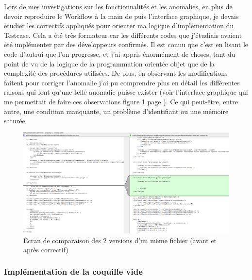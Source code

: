 Lors de mes investigations sur les fonctionnalit\'{e}s et les anomalies, en plus de devoir reproduire le \gls{Workflow} \`{a} la main de puis l'interface graphique, je devais \'{e}tudier les correctifs appliqu\'{e}s pour orienter ma logique d'impl\'{e}mentation du \gls{Testcase}. Cela a \'{e}t\'{e} tr\`{e}s formateur car les diff\'{e}rents codes que j'\'{e}tudiais avaient \'{e}t\'{e} impl\'{e}menter par des d\'{e}veloppeurs confirm\'{e}s. Il est connu que c'est en lisant le code d'autrui que l'on progresse, et j'ai appris \'{e}norm\'{e}ment de choses, tant du point de vu de la logique de la programmation orient\'{e}e objet que de la complexit\'{e} des proc\'{e}dures utilis\'{e}es. De plus, en observant les modifications faitent pour corriger l'anomalie j'ai pu comprendre plus en d\'{e}tail les diff\'{e}rentes raisons qui font qu'une telle anomalie puisse exister (voir l'interface graphique qui me permettait de faire ces observations figure \ref{figure:diffAgainst} page \pageref{figure:diffAgainst}). Ce qui peut-\^{e}tre, entre autre, une condition manquante, un probl\`{e}me d'identifiant ou une m\'{e}moire satur\'{e}e.\\


\begin{figure}[!ht]
  \centering
      \includegraphics[width=\textwidth]{images/diffAgainst.png}
  \caption{\'{E}cran de comparaison des 2 versions d'un m\^{e}me fichier (avant et apr\`{e}s correctif)}
	\label{figure:diffAgainst}
\end{figure}




\subsubsection{Impl\'{e}mentation de la coquille vide}

